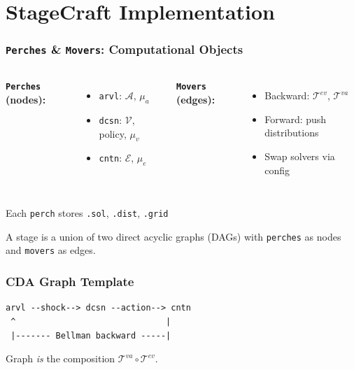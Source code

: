 \documentclass[10pt]{beamer}
\begin{document}
\section{StageCraft Implementation}

\begin{frame}
  \frametitle{\texttt{Perches} \& \texttt{Movers}: Computational Objects}
  
  \begin{columns}[T]
    \textbf{\texttt{Perches} (nodes):}
    \begin{itemize}
      \item \texttt{arvl}: $\mathscr A$, $\mu_a$
      \item \texttt{dcsn}: $\mathscr V$, policy, $\mu_v$
      \item \texttt{cntn}: $\mathscr E$, $\mu_e$
    \end{itemize}
    
    \textbf{\texttt{Movers} (edges):}
    \begin{itemize}
      \item Backward: $\mathscr{T}^{ev}$, $\mathscr{T}^{va}$
      \item Forward: push distributions
      \item Swap solvers via config
    \end{itemize}
  \end{columns}
  
  \vspace{0.5em}
  Each \texttt{perch} stores \texttt{.sol}, \texttt{.dist}, \texttt{.grid}
\end{frame}

\begin{frame}[fragile]

A stage is a union of two direct acyclic graphs (DAGs) with \texttt{perches} as nodes and \texttt{movers} as edges. 

  \frametitle{CDA Graph Template}
\begin{lstlisting}[numbers=none,basicstyle=\ttfamily\small,frame=none]
arvl --shock--> dcsn --action--> cntn
 ^                              |
 |------- Bellman backward -----|
\end{lstlisting}
  Graph \emph{is} the composition $\mathscr T^{va}\!\circ\!\mathscr T^{ev}$. 
\end{frame}
\end{document}
